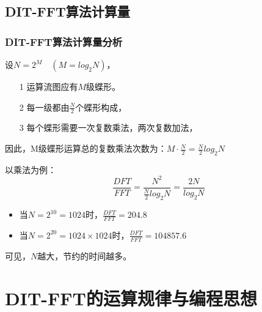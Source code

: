 \documentclass[notheorems,compress,mathserif,table]{beamer}
\begin{document}
\subsection{DIT-FFT算法计算量}
\begin{frame}[shrink]\frametitle{DIT-FFT算法计算量分析}
设$N=2^M\quad(M=log_2 N)$，
\begin{enumerate}
  \item [1] 运算流图应有$M$级蝶形。
  \item [2] 每一级都由$\frac{N}{2}$个蝶形构成，
  \item [3] 每个蝶形需要一次复数乘法，两次复数加法，
\end{enumerate}
因此，M级蝶形运算总的复数乘法次数为：$M\cdot\frac{N}{2}=\frac{N}{2}log_2 N$

以乘法为例：
$$\frac{DFT}{FFT}= \frac{N^2}{\frac{N}{2}log_2 N}=\frac{2N}{log_2 N}$$
\begin{itemize}
  \item 当$N=2^{10}=1024$时，$\frac{DFT}{FFT}=204.8$
  \item 当$N=2^{20}=1024 \times 1024$时，$\frac{DFT}{FFT}= 104857.6$
\end{itemize}
可见，$N$越大，节约的时间越多。
\end{frame}
\section{DIT-FFT的运算规律与编程思想}
\end{document}
